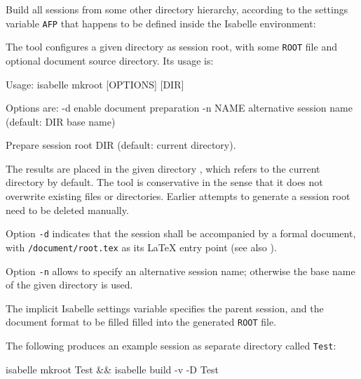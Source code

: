 \begin{isabellebody}
\begin{isamarkuptext}
  \smallskip Build all sessions from some other directory hierarchy,
  according to the settings variable \verb|AFP| that happens to
  be defined inside the Isabelle environment:
%
\end{isamarkuptext}%
\isamarkuptrue%
%
\isamarkuptrue%
%
\begin{isamarkuptext}%
The \hypertarget{tool.mkroot}{\hyperlink{tool.mkroot}{\mbox{}}} tool configures a given directory as
  session root, with some \verb|ROOT| file and optional document
  source directory.  Its usage is:
\begin{ttbox}
Usage: isabelle mkroot [OPTIONS] [DIR]

  Options are:
    -d           enable document preparation
    -n NAME      alternative session name (default: DIR base name)

  Prepare session root DIR (default: current directory).
\end{ttbox}

  The results are placed in the given directory , which
  refers to the current directory by default.  The \hyperlink{tool.mkroot}{\mbox{}} tool
  is conservative in the sense that it does not overwrite existing
  files or directories.  Earlier attempts to generate a session root
  need to be deleted manually.

  \medskip Option \verb|-d| indicates that the session shall be
  accompanied by a formal document, with \verb|/document/root.tex| as its {\LaTeX} entry point (see also
  ).

  Option \verb|-n| allows to specify an alternative session
  name; otherwise the base name of the given directory is used.

  \medskip The implicit Isabelle settings variable \hyperlink{setting.ISABELLE-LOGIC}{\mbox{}} specifies the parent session, and \hyperlink{setting.ISABELLE-DOCUMENT-FORMAT}{\mbox{}} the document format to be filled filled
  into the generated \verb|ROOT| file.%
\end{isamarkuptext}%
\isamarkuptrue%
%
\isamarkuptrue%
%
\begin{isamarkuptext}%
The following produces an example session as separate
  directory called \verb|Test|:
\begin{ttbox}
isabelle mkroot Test && isabelle build -v -D Test
\end{ttbox}


\end{isamarkuptext}
\end{isabellebody}
